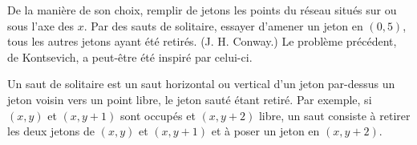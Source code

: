 De la manière de son choix, remplir de jetons les points du réseau situés sur ou sous l'axe des $x$. Par des sauts de solitaire, essayer d'amener un jeton en $(0, 5)$, tous les autres jetons ayant été retirés. (J. H. Conway.) Le problème précédent, de Kontsevich, a peut-être été inspiré par celui-ci.

Un saut de solitaire est un saut horizontal ou vertical d'un jeton par-dessus un jeton voisin vers un point libre, le jeton sauté étant retiré. Par exemple, si $(x, y)$ et $(x, y + 1)$ sont occupés et $(x, y + 2)$ libre, un saut consiste à retirer les deux jetons de $(x, y)$ et $(x, y + 1)$ et à poser un jeton en $(x, y + 2)$.
